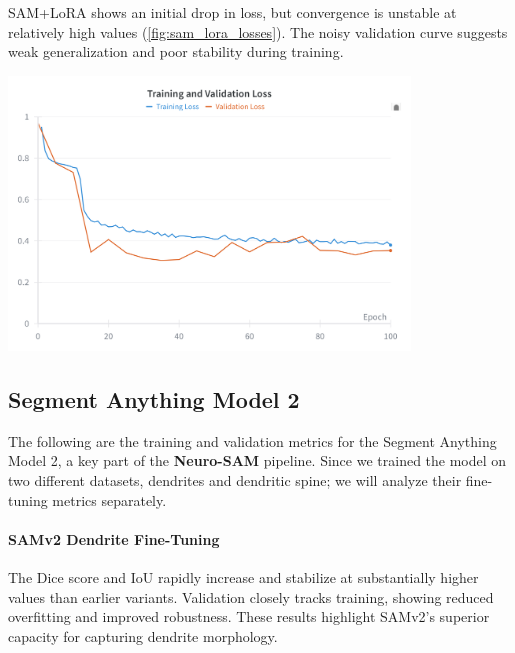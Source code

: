 SAM+LoRA shows an initial drop in loss, but convergence is unstable at relatively high values (\autoref{fig:sam_lora_losses}). The noisy validation curve suggests weak generalization and poor stability during training.
\begin{center}
\includegraphics[width=0.8\textwidth]{figures/50_sam_lora_loss.png}
\label{fig:sam_lora_losses}
\end{center}


\subsection{Segment Anything Model 2}
\label{sec:sam2_plots}

The following are the training and validation metrics for the Segment Anything Model 2, a key part of the \textbf{Neuro-SAM} pipeline. Since we trained the model on two different datasets, dendrites and dendritic spine; we will analyze their fine-tuning metrics separately. 

\paragraph{SAMv2 Dendrite Fine-Tuning}

The Dice score and IoU rapidly increase and stabilize at substantially higher values than earlier variants. Validation closely tracks training, showing reduced overfitting and improved robustness. These results highlight SAMv2’s superior capacity for capturing dendrite morphology.


